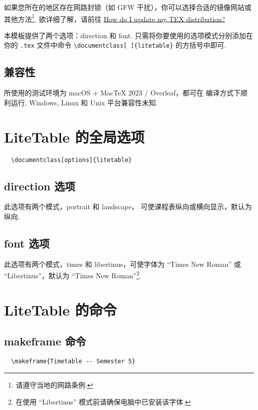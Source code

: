 \documentclass[11pt]{article}
\def\pkg#1{\texorpdfstring{\textcolor{pkgcolor}{\textsf{#1}}}{“#1”}}
\def\mode#1{\texorpdfstring{\textcolor{moducolor}{\textsf{#1}}}{“#1”}}
\def\cmd#1{\texorpdfstring{\textcolor{cmdcolor}{\textsf{#1}}}{“#1”}}
\begin{document}
如果您所在的地区存在网路封锁（如 GFW 干扰），你可以选择合适的镜像网站或其他方法\footnote{请遵守当地的网路条例.}. 欲详细了解，请前往 \href{https://tex.stackexchange.com/questions/55437/how-do-i-update-my-tex-distribution}{How do I update my TEX distribution?}

本模板提供了两个选项：\mode{direction} 和 \mode{font}. 只需将你要使用的选项模式分别添加在你的 \verb|.tex| 文件中命令 \verb|\documentclass[ ]{litetable}| 的方括号中即可.

\subsection{兼容性}
所使用的测试环境为 macOS + MacTeX 2023 / Overleaf，都可在 \XeLaTeX{} 编译方式下顺利运行, Windows, Linux 和 Unix 平台兼容性未知.

\section{\pkg{LiteTable} 的全局选项}
\begin{verbatim}
  \documentclass[options]{litetable}
\end{verbatim}

\subsection{\mode{direction} 选项}
此选项有两个模式，\mode{portrait} 和 \mode{landscape}， 可使课程表纵向或横向显示，默认为纵向.

\subsection{\mode{font} 选项}
此选项有两个模式，\mode{times} 和 \mode{libertinus}，可使字体为 ``Times New Roman'' 或 ``Libertinus''，默认为 ``Times New Roman''\footnote{在使用 ``Libertinus'' 模式前请确保电脑中已安装该字体.}.

\section{\pkg{LiteTable} 的命令}

\subsection{\cmd{makeframe} 命令}
\begin{verbatim}
  \makeframe{Timetable -- Semester 5}
\end{verbatim}
\end{document}
